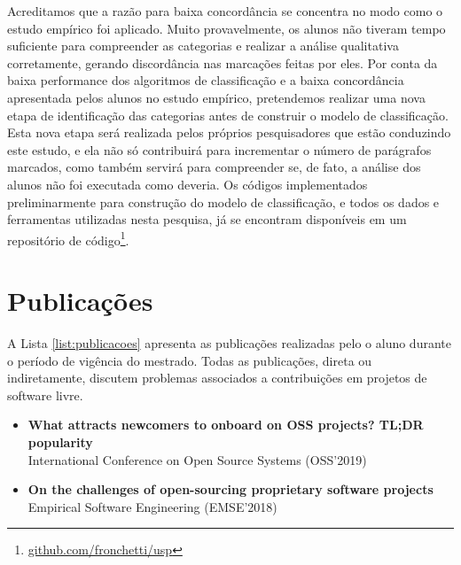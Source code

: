 Acreditamos que a razão para baixa concordância se concentra no modo como o estudo empírico foi aplicado. Muito provavelmente, os alunos não tiveram tempo suficiente para compreender as categorias e realizar a análise qualitativa corretamente, gerando discordância nas marcações feitas por eles. Por conta da baixa performance dos algoritmos de classificação e a baixa concordância apresentada pelos alunos no estudo empírico, pretendemos realizar uma nova etapa de identificação das categorias antes de construir o modelo de classificação. Esta nova etapa será realizada pelos próprios pesquisadores que estão conduzindo este estudo, e ela não só contribuirá para incrementar o número de parágrafos marcados, como também servirá para compreender se, de fato, a análise dos alunos não foi executada como deveria. Os códigos implementados preliminarmente para construção do modelo de classificação, e todos os dados e ferramentas utilizadas nesta pesquisa, já se encontram disponíveis em um repositório de código\footnote{\url{github.com/fronchetti/usp}}. 

\section{Publicações}
A Lista \ref{list:publicacoes} apresenta as publicações realizadas pelo o aluno durante o período de vigência do mestrado. Todas as publicações, direta ou indiretamente, discutem problemas associados a contribuições em projetos de software livre.

\begin{itemize}
    \label{list:publicacoes}
    \item \textbf{What attracts newcomers to onboard on OSS projects? TL;DR popularity} \\
    International Conference on Open Source Systems (OSS'2019)
    \item \textbf{On the challenges of open-sourcing proprietary software projects} \\
    Empirical Software Engineering  (EMSE'2018)
\end{itemize}